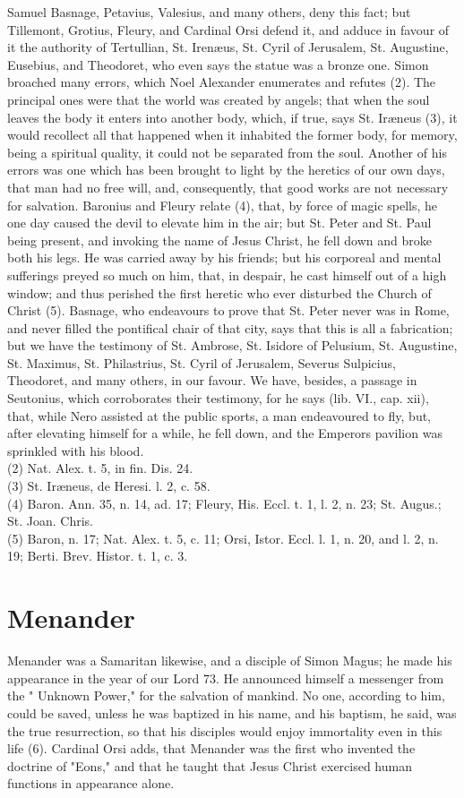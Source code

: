\documentclass[12pt]{book}
\begin{document}
Samuel Basnage, Petavius, Valesius, and many others, deny this fact; but Tillemont, Grotius, Fleury, and
Cardinal Orsi defend it, and adduce in favour of it the authority of Tertullian, St. Irenæus, St. Cyril of
Jerusalem, St. Augustine, Eusebius, and Theodoret, who even says the statue was a bronze one. Simon
broached many errors, which Noel Alexander enumerates and refutes (2). The principal ones were that
the world was created by angels; that when the soul leaves the body it enters into another body, which, if
true, says St. Iræneus (3), it would recollect all that happened when it inhabited the former body, for
memory, being a spiritual quality, it could not be separated from the soul. Another of his errors was one
which has been brought to light by the heretics of our own days, that man had no free will, and,
consequently, that good works are not necessary for salvation. Baronius and Fleury relate (4), that, by
force of magic spells, he one day caused the devil to elevate him in the air; but St. Peter and St. Paul being
present, and invoking the name of Jesus Christ, he fell down and broke both his legs. He was carried
away by his friends; but his corporeal and mental sufferings preyed so much on him, that, in despair, he
cast himself out of a high window; and thus perished the first heretic who ever disturbed the Church of
Christ (5). Basnage, who endeavours to prove that St. Peter never was in Rome, and never filled the
pontifical chair of that city, says that this is all a fabrication; but we have the testimony of St. Ambrose, St.
Isidore of Pelusium, St. Augustine, St. Maximus, St. Philastrius, St. Cyril of Jerusalem, Severus Sulpicius,
Theodoret, and many others, in our favour. We have, besides, a passage in Seutonius, which corroborates
their testimony, for he says (lib. VI., cap. xii), that, while Nero assisted at the public sports, a man
endeavoured to fly, but, after elevating himself for a while, he fell down, and the Emperors pavilion was
sprinkled with his blood.\\
(2) Nat. Alex. t. 5, in fin. Dis. 24.\\
(3) St. Iræneus, de Heresi. l. 2, c. 58.\\
(4) Baron. Ann. 35, n. 14, ad. 17; Fleury, His. Eccl. t. 1, l. 2, n. 23; St. Augus.; St. Joan. Chris.\\
(5) Baron, n. 17; Nat. Alex. t. 5, c. 11; Orsi, Istor. Eccl. l. 1, n. 20, and l. 2, n. 19; Berti. Brev. Histor. t. 1, c. 3.\\

\section{Menander}
Menander was a Samaritan likewise, and a disciple of Simon Magus; he made his appearance in the
year of our Lord 73. He announced himself a messenger from the " Unknown Power," for the salvation of
mankind. No one, according to him, could be saved, unless he was baptized in his name, and his baptism,
he said, was the true resurrection, so that his disciples would enjoy immortality even in this life (6).
Cardinal Orsi adds, that Menander was the first who invented the doctrine of "Eons," and that he taught
that Jesus Christ exercised human functions in appearance alone.
\end{document}
